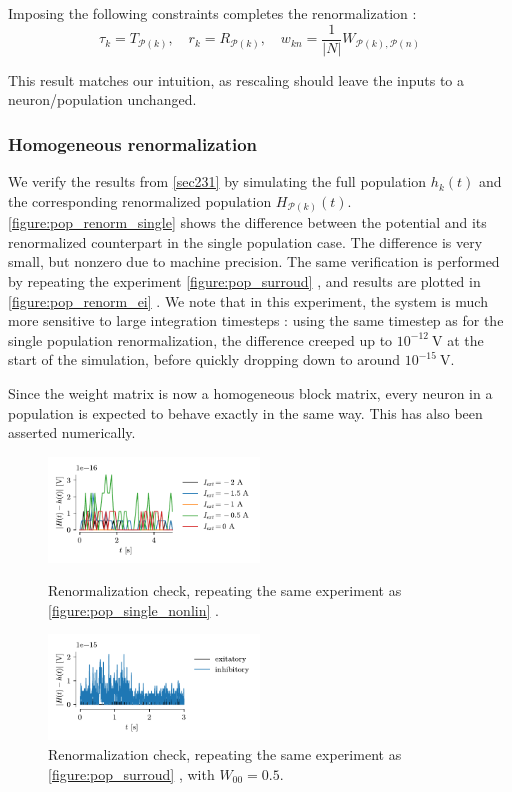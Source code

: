 \documentclass[10pt,conference,compsocconf,a4paper]{IEEEtran}
\newcommand{\nunit}[1]{\ \si{#1}}
\newcommand*{\shortautoref}[1]{%
	\begingroup
	\def\equationautorefname{\textsc{Eq.}}%
	\def\tableautorefname{\textsc{Tab.}}%
	\def\figureautorefname{\textsc{Fig.}}%
	\autoref{#1}%
	\endgroup
}
\begin{document}
			Imposing the following constraints completes the renormalization :
\
			\begin{equation*}
				\tau_k = T_{\mathcal P(k)}, \quad r_k = R_{\mathcal P(k)}, \quad w_{kn} = \frac{1}{|N|} W_{\mathcal P(k),\mathcal P(n)}
			\end{equation*}

			This result matches our intuition, as rescaling should leave the inputs to a neuron/population unchanged.

		\subsubsection{Homogeneous renormalization}

			We verify the results from \shortautoref{sec231} by simulating the full population $h_k(t)$ and the corresponding renormalized population $H_{\mathcal P(k)}(t)$. \shortautoref{figure:pop_renorm_single} shows the difference between the potential and its renormalized counterpart in the single population case. The difference is very small, but nonzero due to machine precision. The same verification is performed by repeating the experiment \shortautoref{figure:pop_surroud}, and results are plotted in \shortautoref{figure:pop_renorm_ei}. We note that in this experiment, the system is much more sensitive to large integration timesteps : using the same timestep as for the single population renormalization, the difference creeped up to $10^{-12} \nunit{\volt}$ at the start of the simulation, before quickly dropping down to around $10^{-15} \nunit{\volt}$.

			Since the weight matrix is now a homogeneous block matrix, every neuron in a population is expected to behave exactly in the same way. This has also been asserted numerically.

			\begin{figure}
				\centering
				\includegraphics[width=0.5\textwidth]{figures/pop_renorm_single.pdf}
				\caption{Renormalization check, repeating the same experiment as \shortautoref{figure:pop_single_nonlin}.}
				\label{figure:pop_renorm_single}
				\centering
				\includegraphics[width=0.5\textwidth]{figures/pop_renorm_ei.pdf}
				\caption{Renormalization check, repeating the same experiment as \shortautoref{figure:pop_surroud}, with $W_{00}=0.5$.}
				\label{figure:pop_renorm_ei}
			\end{figure}
\end{document}
